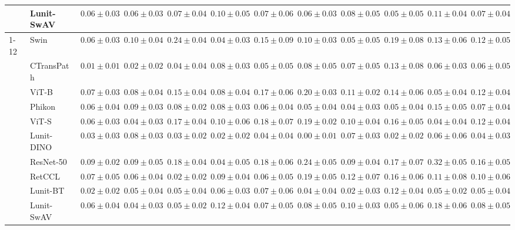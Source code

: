 \begin{tabular}{ll|cccc|c|cccc|c}
 & Lunit-SwAV & $0.06 \pm 0.03$ & $0.06 \pm 0.03$ & $0.07 \pm 0.04$ & $0.10 \pm 0.05$ & $0.07 \pm 0.06$ & $0.06 \pm 0.03$ & $0.08 \pm 0.05$ & $0.05 \pm 0.05$ & $0.11 \pm 0.04$ & $0.07 \pm 0.04$ \\
\cline{1-12}
\multirow[t]{10}{*}{Transformer} & Swin & $0.06 \pm 0.03$ & $0.10 \pm 0.04$ & $0.24 \pm 0.04$ & $0.04 \pm 0.03$ & $0.15 \pm 0.09$ & $0.10 \pm 0.03$ & $0.05 \pm 0.05$ & $0.19 \pm 0.08$ & $0.13 \pm 0.06$ & $0.12 \pm 0.05$ \\
 & CTransPath & $\mathbf{0.01 \pm 0.01}$ & $\mathbf{0.02 \pm 0.02}$ & $0.04 \pm 0.04$ & $0.08 \pm 0.03$ & $0.05 \pm 0.05$ & $0.08 \pm 0.05$ & $0.07 \pm 0.05$ & $0.13 \pm 0.08$ & $0.06 \pm 0.03$ & $0.06 \pm 0.05$ \\
 & ViT-B & $0.07 \pm 0.03$ & $0.08 \pm 0.04$ & $0.15 \pm 0.04$ & $0.08 \pm 0.04$ & $0.17 \pm 0.06$ & $0.20 \pm 0.03$ & $0.11 \pm 0.02$ & $0.14 \pm 0.06$ & $0.05 \pm 0.04$ & $0.12 \pm 0.04$ \\
 & Phikon & $0.06 \pm 0.04$ & $0.09 \pm 0.03$ & $0.08 \pm 0.02$ & $0.08 \pm 0.03$ & $0.06 \pm 0.04$ & $0.05 \pm 0.04$ & $0.04 \pm 0.03$ & $0.05 \pm 0.04$ & $0.15 \pm 0.05$ & $0.07 \pm 0.04$ \\
 & ViT-S & $0.06 \pm 0.03$ & $0.04 \pm 0.03$ & $0.17 \pm 0.04$ & $0.10 \pm 0.06$ & $0.18 \pm 0.07$ & $0.19 \pm 0.02$ & $0.10 \pm 0.04$ & $0.16 \pm 0.05$ & $\mathbf{0.04 \pm 0.04}$ & $0.12 \pm 0.04$ \\
 & Lunit-DINO & $0.03 \pm 0.03$ & $0.08 \pm 0.03$ & $0.03 \pm 0.02$ & $\mathbf{0.02 \pm 0.02}$ & $\mathbf{0.04 \pm 0.04}$ & $\mathbf{0.00 \pm 0.01}$ & $0.07 \pm 0.03$ & $\mathbf{0.02 \pm 0.02}$ & $0.06 \pm 0.06$ & $\mathbf{0.04 \pm 0.03}$ \\
 & ResNet-50 & $0.09 \pm 0.02$ & $0.09 \pm 0.05$ & $0.18 \pm 0.04$ & $0.04 \pm 0.05$ & $0.18 \pm 0.06$ & $0.24 \pm 0.05$ & $0.09 \pm 0.04$ & $0.17 \pm 0.07$ & $0.32 \pm 0.05$ & $0.16 \pm 0.05$ \\
 & RetCCL & $0.07 \pm 0.05$ & $0.06 \pm 0.04$ & $\mathbf{0.02 \pm 0.02}$ & $0.09 \pm 0.04$ & $0.06 \pm 0.05$ & $0.19 \pm 0.05$ & $0.12 \pm 0.07$ & $0.16 \pm 0.06$ & $0.11 \pm 0.08$ & $0.10 \pm 0.06$ \\
 & Lunit-BT & $0.02 \pm 0.02$ & $0.05 \pm 0.04$ & $0.05 \pm 0.04$ & $0.06 \pm 0.03$ & $0.07 \pm 0.06$ & $0.04 \pm 0.04$ & $\mathbf{0.02 \pm 0.03}$ & $0.12 \pm 0.04$ & $0.05 \pm 0.02$ & $0.05 \pm 0.04$ \\
 & Lunit-SwAV & $0.06 \pm 0.04$ & $0.04 \pm 0.03$ & $0.05 \pm 0.02$ & $0.12 \pm 0.04$ & $0.07 \pm 0.05$ & $0.08 \pm 0.05$ & $0.10 \pm 0.03$ & $0.05 \pm 0.06$ & $0.18 \pm 0.06$ & $0.08 \pm 0.05$ \\

\end{tabular}
